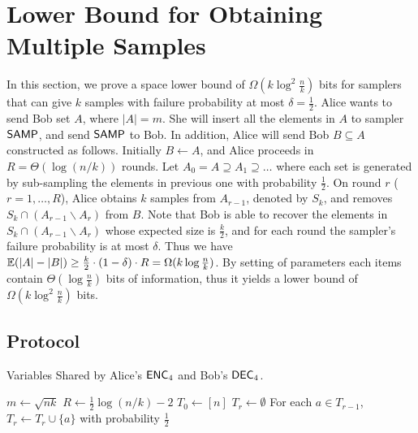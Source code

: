 \section{Lower Bound for Obtaining Multiple Samples}\label{sec:k-samples-lb}

In this section, we prove a space lower bound of $\Omega(k\log^2
\frac{n}{k})$ bits for samplers that can give $k$ samples with failure probability at most $\delta = \frac{1}{2}$. 
Alice wants to send Bob set $A$, where $|A|=m$. She will insert all the elements in $A$ to sampler $\textsf{SAMP}$, and send $\textsf{SAMP}$ to Bob. 
In addition, Alice will send Bob $B\subseteq A$ constructed as follows.
Initially $B\leftarrow A$, and Alice proceeds in $R=\Theta(\log (n/k))$ rounds. 
Let $A_0=A\supseteq A_1\supseteq \ldots$ where each set is generated by sub-sampling the elements in previous one with probability $\frac{1}{2}$. 
On round $r$ ($r=1,\ldots, R$), Alice obtains $k$ samples from $A_{r-1}$, denoted by $S_k$, and removes $S_k\cap (A_{r-1}\backslash A_{r})$ from $B$. 
Note that Bob is able to recover the elements in $S_k\cap (A_{r-1}\backslash A_{r})$ whose expected size is $\frac{k}{2}$, and for each round the sampler's failure probability is at most $\delta$. 
Thus we have $\operatorname*{\mathbb{E}}(|A|-|B|)\ge \frac{k}{2}\cdot (1-\delta) \cdot R=\Omega(k\log\frac{n}{k})$. By setting of parameters each items contain $\Theta(\log \frac{n}{k})$ bits of information, thus it yields a lower bound of $\Omega(k\log^2\frac{n}{k})$ bits.

\subsection{Protocol}
\begin{algorithm}[H] 
  \caption{Variables Shared by Alice's $\textsf{ENC}_4$ and Bob's $\textsf{DEC}_4$.} \label{algo:para4}
  \begin{algorithmic}[1] 
    \State $m\leftarrow \sqrt{nk}$
    \State $R\leftarrow \frac{1}{2}\log (n/k) - 2$
    \State $T_0\leftarrow [n]$
      \State $T_r\leftarrow \emptyset$
      \State For each $a\in T_{r-1}$, $T_r\leftarrow T_r\cup \{a\}$ with probability $\frac{1}{2}$
    \EndFor
  \end{algorithmic}
\end{algorithm}

